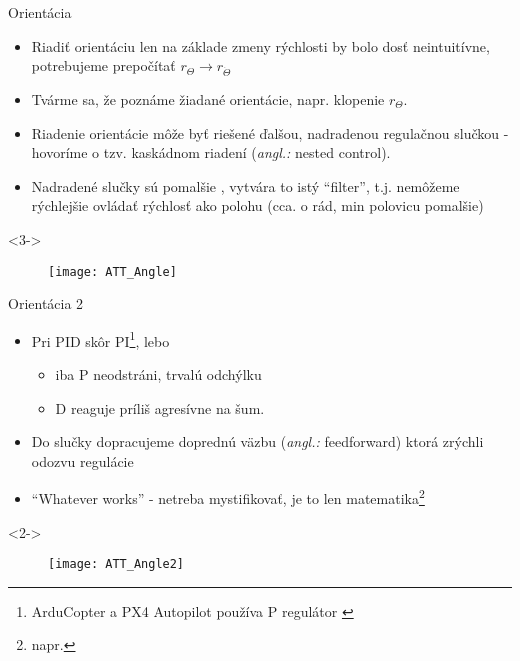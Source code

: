 \documentclass{beamer}
\newcommand{\angl}[1]{{\color{gray}(\emph{angl.:} #1)}}
\begin{document}
\begin{frame}[t]{Orientácia}
\begin{itemize}
  \item<1-> Riadiť orientáciu len na základe zmeny rýchlosti by bolo dosť neintuitívne, potrebujeme prepočítať $r_{\Theta} \rightarrow r_{\dot{\Theta}}$
  \item<2-> Tvárme sa, že poznáme žiadané orientácie, napr. klopenie $r_{\Theta}$.
  \item<3-> Riadenie orientácie môže byť riešené ďalšou, nadradenou regulačnou slučkou - hovoríme o tzv. kaskádnom riadení \angl{nested control}.
  \item<4-> Nadradené slučky sú pomalšie \citep{AP:PID}, vytvára to istý ``filter'', t.j. nemôžeme rýchlejšie ovládať rýchlosť ako polohu (cca. o rád, min polovicu pomalšie)
  \end{itemize}

  \begin{onlyenv}<3->
  \begin{figure}
\centering
  \texttt{[image: ATT\_Angle]}\\
\end{figure}
\end{onlyenv}

  \end{frame}



    \begin{frame}[t]{Orientácia 2}
\begin{itemize}
  \item<1-> Pri PID skôr PI\footnote{ArduCopter a PX4 Autopilot používa P regulátor \citep{PX4:PID,AP:PIDDOC}}, lebo
  \begin{itemize}
            \item iba P neodstráni, trvalú odchýlku
            \item D reaguje príliš agresívne na šum.
  \end{itemize}
      \item<2-> Do slučky dopracujeme doprednú väzbu \angl{feedforward} ktorá zrýchli odozvu regulácie
      \item<3-> ``Whatever works'' - netreba mystifikovať, je to len matematika\footnote{napr. }
  \end{itemize}


  \begin{onlyenv}<2->
\begin{figure}
\centering
  \texttt{[image: ATT\_Angle2]}\\
\end{figure}
\end{onlyenv}

  \end{frame}
\end{document}
